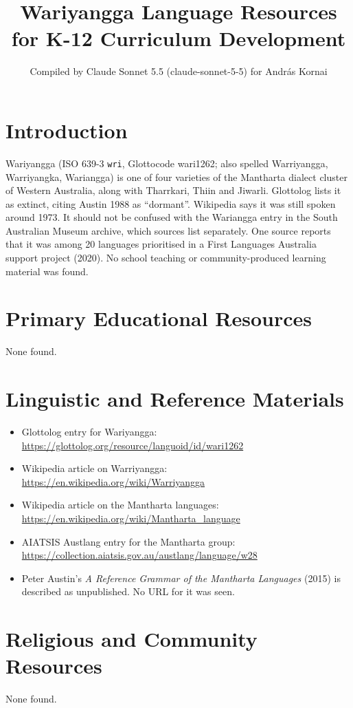 \documentclass[12pt]{article}
\title{Wariyangga Language Resources for K-12 Curriculum Development}
\author{Compiled by Claude Sonnet 5.5 (claude-sonnet-5-5) for Andr\'as Kornai}
\date{}
\begin{document}
\maketitle

\section{Introduction}
Wariyangga (ISO 639-3 \texttt{wri}, Glottocode wari1262; also spelled Warriyangga, Warriyangka, Wariangga) is one of four varieties of the Mantharta dialect cluster of Western Australia, along with Tharrkari, Thiin and Jiwarli. Glottolog lists it as extinct, citing Austin 1988 as ``dormant''. Wikipedia says it was still spoken around 1973. It should not be confused with the Wariangga entry in the South Australian Museum archive, which sources list separately. One source reports that it was among 20 languages prioritised in a First Languages Australia support project (2020). No school teaching or community-produced learning material was found.

\section{Primary Educational Resources}
None found.

\section{Linguistic and Reference Materials}
\begin{itemize}
\item Glottolog entry for Wariyangga: \url{https://glottolog.org/resource/languoid/id/wari1262}
\item Wikipedia article on Warriyangga: \url{https://en.wikipedia.org/wiki/Warriyangga}
\item Wikipedia article on the Mantharta languages: \url{https://en.wikipedia.org/wiki/Mantharta_language}
\item AIATSIS Austlang entry for the Mantharta group: \url{https://collection.aiatsis.gov.au/austlang/language/w28}
\item Peter Austin's \emph{A Reference Grammar of the Mantharta Languages} (2015) is described as unpublished. No URL for it was seen.
\end{itemize}

\section{Religious and Community Resources}
None found.
\end{document}
